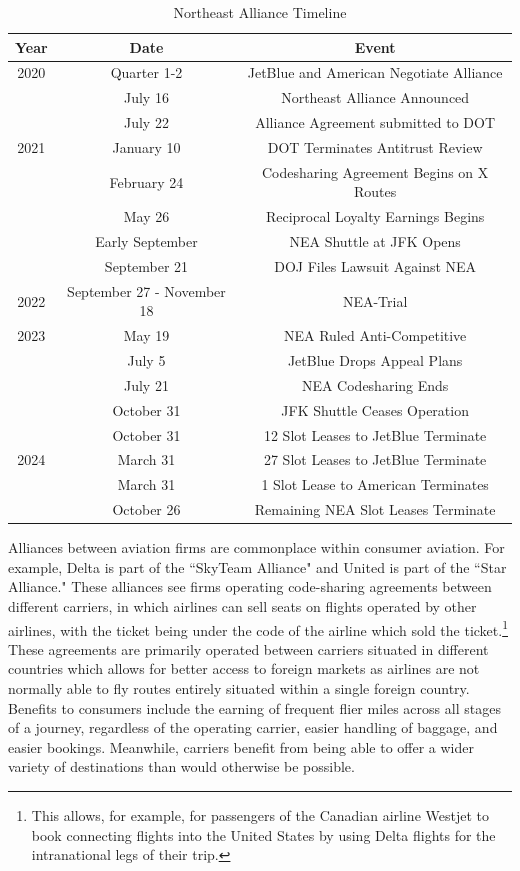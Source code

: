 \documentclass{article}
\begin{document}
    \begin{table}[tb]
		\caption{Northeast Alliance Timeline}
		\label{tab:NEA_Timeline}
		\begin{center}
			\begin{tabular}{ccc}
				\hline
				Year & Date & Event \\
				\hline
				2020 & Quarter 1-2 & JetBlue and American Negotiate Alliance \\ 
				& July 16 & Northeast Alliance Announced \\
				& July 22 & Alliance Agreement submitted to DOT \\
				\hline 
				2021 & January 10 & DOT Terminates Antitrust Review \\
				& February 24 & Codesharing Agreement Begins on {X} Routes \\
				& May 26 & Reciprocal Loyalty Earnings Begins \\
				& Early September & NEA Shuttle at JFK Opens \\
				& September 21 & DOJ Files Lawsuit Against NEA \\  
				\hline
				2022 & September 27 - November 18 & NEA-Trial \\
				\hline 
				2023 & May 19 & NEA Ruled Anti-Competitive \\
				& July 5 & JetBlue Drops Appeal Plans \\
				& July 21 & NEA Codesharing Ends \\
				& October 31 & JFK Shuttle Ceases Operation\\
				& October 31 & 12 Slot Leases to JetBlue Terminate \\
				\hline 
				2024 &  March 31  & 27 Slot Leases to JetBlue Terminate \\ 
				& March 31 & 1 Slot Lease to American Terminates \\
				& October 26 & Remaining NEA Slot Leases Terminate				 \end{tabular}
		\end{center}
	\end{table}

	Alliances between aviation firms are commonplace within consumer aviation. For example, Delta is part of the ``SkyTeam Alliance" and United is part of the ``Star Alliance." These alliances see firms operating code-sharing agreements between different carriers, in which airlines can sell seats on flights operated by other airlines, with the ticket being under the code of the airline which sold the ticket.\footnote{This allows, for example, for passengers of the Canadian airline Westjet to book connecting flights into the United States by using Delta flights for the intranational legs of their trip.}  These agreements are primarily operated between carriers situated in different countries which allows for better access to foreign markets as airlines are not normally able to fly routes entirely situated within a single foreign country. Benefits to consumers include the earning of frequent flier miles across all stages of a journey, regardless of the operating carrier, easier handling of baggage, and easier bookings. Meanwhile, carriers benefit from being able to offer a wider variety of destinations than would otherwise be possible.
	
\end{document}
